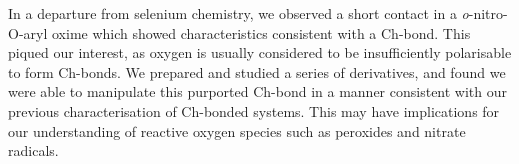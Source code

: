 {In a departure from selenium chemistry, we observed a  short contact in a \textit{o}-nitro-O-aryl oxime which showed characteristics consistent with a Ch-bond.
This piqued our interest, as oxygen is usually considered to be insufficiently polarisable to form Ch-bonds.
We prepared and studied a series of derivatives, and found we were able to manipulate this purported Ch-bond in a manner consistent with our previous characterisation of Ch-bonded systems.
This may have implications for our understanding of reactive oxygen species such as peroxides and nitrate radicals.



}